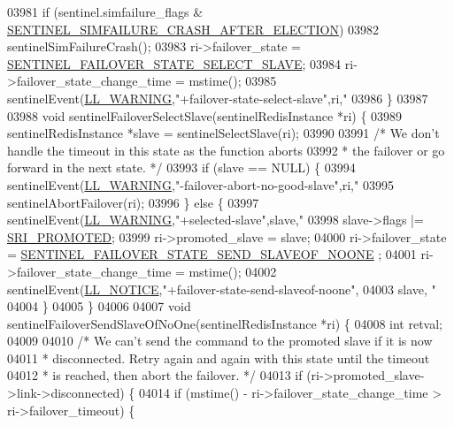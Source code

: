 \begin{DoxyCode}
{{{{{{{{{{{{{{{{{{{{{{{{{{{{{{{{{{{{{{{{{{{{{{{{{{{{{{{{{{{{{{{{{{{{{{{{{{{{{{{{{{{{{{{{{03981     \textcolor{keywordflow}{if} (sentinel.simfailure\_flags & 
      \hyperlink{sentinel_8c_a8549938b8489bb23679cf13b8d99997c}{SENTINEL\_SIMFAILURE\_CRASH\_AFTER\_ELECTION})
03982         sentinelSimFailureCrash();
03983     ri->failover\_state = \hyperlink{sentinel_8c_ab69af026a9f736ca81bfffd4eeada38f}{SENTINEL\_FAILOVER\_STATE\_SELECT\_SLAVE};
03984     ri->failover\_state\_change\_time = mstime();
03985     sentinelEvent(\hyperlink{server_8h_a31229b9334bba7d6be2a72970967a14b}{LL\_WARNING},\textcolor{stringliteral}{"+failover-state-select-slave"},ri,\textcolor{stringliteral}{"%
03986 \}
03987 
03988 \textcolor{keywordtype}{void} sentinelFailoverSelectSlave(sentinelRedisInstance *ri) \{
03989     sentinelRedisInstance *slave = sentinelSelectSlave(ri);
03990 
03991     \textcolor{comment}{/* We don't handle the timeout in this state as the function aborts}
03992 \textcolor{comment}{     * the failover or go forward in the next state. */}
03993     \textcolor{keywordflow}{if} (slave == NULL) \{
03994         sentinelEvent(\hyperlink{server_8h_a31229b9334bba7d6be2a72970967a14b}{LL\_WARNING},\textcolor{stringliteral}{"-failover-abort-no-good-slave"},ri,\textcolor{stringliteral}{"%
03995         sentinelAbortFailover(ri);
03996     \} \textcolor{keywordflow}{else} \{
03997         sentinelEvent(\hyperlink{server_8h_a31229b9334bba7d6be2a72970967a14b}{LL\_WARNING},\textcolor{stringliteral}{"+selected-slave"},slave,\textcolor{stringliteral}{"%
03998         slave->flags |= \hyperlink{sentinel_8c_a6c6c019b1af48a9c0e9507422051c684}{SRI\_PROMOTED};
03999         ri->promoted\_slave = slave;
04000         ri->failover\_state = \hyperlink{sentinel_8c_ac89d5b0fc38860b277528c7d3a854580}{SENTINEL\_FAILOVER\_STATE\_SEND\_SLAVEOF\_NOONE}
      ;
04001         ri->failover\_state\_change\_time = mstime();
04002         sentinelEvent(\hyperlink{server_8h_a8c54c191e436c7dd3012167212692401}{LL\_NOTICE},\textcolor{stringliteral}{"+failover-state-send-slaveof-noone"},
04003             slave, \textcolor{stringliteral}{"%
04004     \}
04005 \}
04006 
04007 \textcolor{keywordtype}{void} sentinelFailoverSendSlaveOfNoOne(sentinelRedisInstance *ri) \{
04008     \textcolor{keywordtype}{int} retval;
04009 
04010     \textcolor{comment}{/* We can't send the command to the promoted slave if it is now}
04011 \textcolor{comment}{     * disconnected. Retry again and again with this state until the timeout}
04012 \textcolor{comment}{     * is reached, then abort the failover. */}
04013     \textcolor{keywordflow}{if} (ri->promoted\_slave->link->disconnected) \{
04014         \textcolor{keywordflow}{if} (mstime() - ri->failover\_state\_change\_time > ri->failover\_timeout) \{
}}}}}}}}}}}}}}}}}}}}}}}}}}}}}}}}}}}}}}}}}}}}}}}}}}}}}}}}}}}}}}}}}}}}}}}}}}}}}}}}}}}}}}}}}}}}}
\end{DoxyCode}
